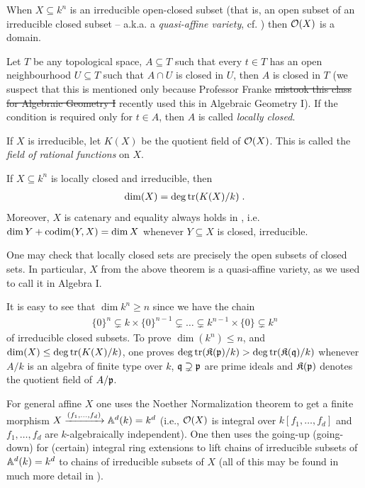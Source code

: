 \documentclass[a4paper,parskip=half,numbers=enddot, DIV=12]{scrreprt}
\begin{document}
\begin{rem}
	When $X\subseteq k^n$ is an irreducible open-closed subset (that is, an open subset of an irreducible closed subset -- a.k.a. a \emph{quasi-affine variety}, cf. \cite[Definition~2.2.1]{alg1}) then $\mathcal{O}(X)$ is a domain. 
\end{rem}
\begin{rem}
	Let $T$ be any topological space, $A\subseteq T$ such that every $t\in T$ has an open neighbourhood $U\subseteq T$ such that $A\cap U$ is closed in $U$, then $A$ is closed in $T$ (we suspect that this is mentioned only because Professor Franke \sout{mistook this class for Algebraic Geometry I} recently used this in Algebraic Geometry I). If the condition is required only for $t\in A$, then $A$ is called \emph{locally closed}.
\end{rem}
If $X$ is irreducible, let $K(X)$ be the quotient field of $\mathcal{O}(X)$. This is called the \emph{field of rational functions} on $X$.
\begin{thm}
	If $X\subseteq k^n$ is locally closed and irreducible, then
	\begin{align*}
	\dim(X) = \deg\operatorname{tr} (K(X)/k)\;.
	\end{align*}
	Moreover, $X$ is catenary and equality always holds in , i.e. $\dim Y +\operatorname{codim}(Y,X) = \dim X$ whenever $Y\subseteq X$ is closed, irreducible.
\end{thm}
One may check that locally closed sets are precisely the open subsets of closed sets. In particular, $X$ from the above theorem is a quasi-affine variety, as we used to call it in Algebra I.
\begin{rem}
	It is easy to see that $\dim k^n \geq n$ since we have the chain
	\begin{align*}
	\{0\}^n \subsetneq k\times\{0\}^{n-1} \subsetneq\ldots\subsetneq k^{n-1}\times\{0\} \subsetneq k^n
	\end{align*} of irreducible closed subsets. To prove $\dim(k^n) \leq n$, and $\dim(X) \leq\deg\operatorname{tr}(K(X)/k)$, one proves $\deg\operatorname{tr}(\mathfrak{K}(\mathfrak{p})/k) > \deg\operatorname{tr}(\mathfrak{K}(\mathfrak{q})/k)$ whenever $A/k$ is an algebra of finite type over $k$, $\mathfrak{q}\supsetneq \mathfrak{p}$ are prime ideals and $\mathfrak{K}(\mathfrak{p})$ denotes the quotient field of $A/\mathfrak{p}$. 
	
	For general affine $X$ one uses the Noether Normalization theorem to get a finite morphism $X\xrightarrow{(f_1,\ldots,f_d)} \mathbb{A}^d(k)=k^d$ (i.e., $\mathcal{O}(X)$ is integral over $k[f_1,\ldots,f_d]$ and $f_1,\ldots,f_d$ are $k$-algebraically independent). One then uses the going-up (going-down) for (certain) integral ring extensions to lift chains of irreducible subsets of $\mathbb{A}^d(k)=k^d$ to chains of irreducible subsets of $X$ (all of this may be found in much more detail in \cite[Section~2.4-2.6]{alg1}).
\end{rem}
\end{document}
